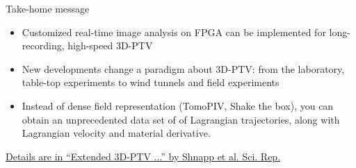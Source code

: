 \documentclass[aspectratio=43]{beamer}
\begin{document}

\begin{frame}{Take-home message}
\begin{itemize}
\item Customized real-time image analysis on FPGA can be implemented for long-recording, high-speed 3D-PTV
\item New developments change a paradigm about 3D-PTV: from the laboratory, table-top experiments to wind tunnels and field experiments
\item Instead of dense field representation (TomoPIV, Shake the box),  you can obtain an unprecedented data set of of Lagrangian trajectories, along with Lagrangian velocity and material derivative. 
\end{itemize}

\begin{cardTiny}\href{https://www.nature.com/articles/s41598-019-43555-2}{Details are in ``Extended 3D-PTV ...'' by Shnapp et al. Sci. Rep.}
\end{cardTiny}

\end{frame}
%

%
%

	 
\end{document}
